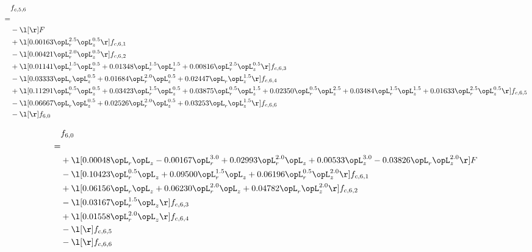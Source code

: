 \begin{alignat}{2} 
\label{eq:f_56_2} 
& f_{c,5,6} \nonumber \\ 
 = \\ 
& - \l[  \r] F \nonumber \\ 
& + \l[  0.00163 \opL_r^{2.5} \opL_z^{0.5}  \r] f_{c,6,1} \nonumber \\ 
& - \l[  0.00421 \opL_r^{2.0} \opL_z^{0.5}  \r] f_{c,6,2} \nonumber \\ 
& + \l[  0.01141 \opL_r^{1.5} \opL_z^{0.5} +  0.01348 \opL_r^{1.5} \opL_z^{1.5} +  0.00816 \opL_r^{2.5} \opL_z^{0.5}  \r] f_{c,6,3} \nonumber \\ 
& - \l[  0.03333 \opL_r \opL_z^{0.5} +  0.01684 \opL_r^{2.0} \opL_z^{0.5} +  0.02447 \opL_r \opL_z^{1.5}  \r] f_{c,6,4} \nonumber \\ 
& + \l[  0.11291 \opL_r^{0.5} \opL_z^{0.5} +  0.03423 \opL_r^{1.5} \opL_z^{0.5} +  0.03875 \opL_r^{0.5} \opL_z^{1.5} +  0.02350 \opL_r^{0.5} \opL_z^{2.5} +  0.03484 \opL_r^{1.5} \opL_z^{1.5} +  0.01633 \opL_r^{2.5} \opL_z^{0.5}  \r] f_{c,6,5} \nonumber \\ 
& - \l[  0.06667 \opL_r \opL_z^{0.5} +  0.02526 \opL_r^{2.0} \opL_z^{0.5} +  0.03253 \opL_r \opL_z^{1.5}  \r] f_{c,6,6} \nonumber \\ 
& - \l[  \r] f_{6,0} \nonumber \\ 
\end{alignat} 


\begin{alignat}{2} 
\label{eq:f_60_2} 
& f_{6,0} \nonumber \\ 
 = \\ 
& + \l[  0.00048 \opL_r \opL_z   -0.00167 \opL_r^{3.0} +  0.02993 \opL_r^{2.0} \opL_z +  0.00533 \opL_z^{3.0}   -0.03826 \opL_r \opL_z^{2.0}  \r] F \nonumber \\ 
& - \l[  0.10423 \opL_r^{0.5} \opL_z +  0.09500 \opL_r^{1.5} \opL_z +  0.06196 \opL_r^{0.5} \opL_z^{2.0}  \r] f_{c,6,1} \nonumber \\ 
& + \l[  0.06156 \opL_r \opL_z +  0.06230 \opL_r^{2.0} \opL_z +  0.04782 \opL_r \opL_z^{2.0}  \r] f_{c,6,2} \nonumber \\ 
& - \l[  0.03167 \opL_r^{1.5} \opL_z  \r] f_{c,6,3} \nonumber \\ 
& + \l[  0.01558 \opL_r^{2.0} \opL_z  \r] f_{c,6,4} \nonumber \\ 
& - \l[  \r] f_{c,6,5} \nonumber \\ 
& - \l[  \r] f_{c,6,6} \nonumber \\ 
\end{alignat} 


